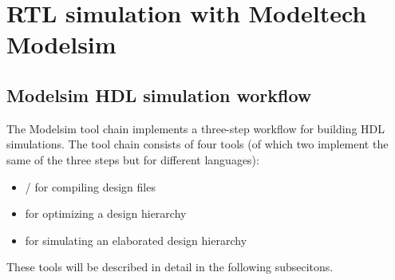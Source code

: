 \chapter{RTL simulation with Modeltech Modelsim}
\label{chap:modelsim}
\section{Modelsim HDL simulation workflow}

The Modelsim tool chain implements a three-step workflow for building \gls{HDL} simulations. The tool
chain consists of four tools (of which two implement the same of the three
steps but for different languages):
\begin{itemize}
	\item {}/ for compiling design files
	\item {} for optimizing a design hierarchy
	\item {} for simulating an elaborated design hierarchy
\end{itemize}

These tools will be described in detail in the following subsecitons.
